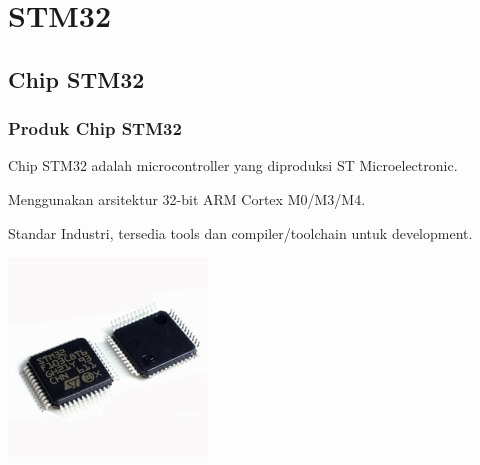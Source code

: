 \documentclass[table,dvipsnames]{beamer}
\begin{document}
	\section{STM32}
	\subsection{Chip STM32}
	\begin{frame}
		\frametitle{Produk Chip STM32}
		\begin{exampleblock}{}
			Chip STM32 adalah microcontroller yang diproduksi ST Microelectronic.
		\end{exampleblock}

		\begin{exampleblock}{}
			Menggunakan arsitektur 32-bit ARM Cortex M0/M3/M4.
		\end{exampleblock}

		\begin{exampleblock}{}
			Standar Industri, tersedia tools dan compiler/toolchain untuk development.
		\end{exampleblock}
		\begin{center}
			\includegraphics[width=150pt]{images/stm32f103c8}
		\end{center}
	\end{frame}
\end{document}
